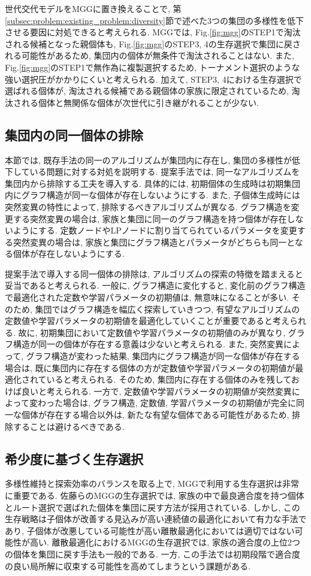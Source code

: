 \documentclass[11pt,oneside,openany,report]{jsbook}
\begin{document}
世代交代モデルをMGGに置き換えることで, 第\ref{subsec:problem:existing_problem:diversity}節で述べた3つの集団の多様性を低下させる要因に対処できると考えられる. MGGでは, Fig.\ref{fig:mgg}のSTEP1で淘汰される候補となった親個体も, Fig.\ref{fig:mgg}のSTEP3, 4の生存選択で集団に戻される可能性があるため, 集団内の個体が無条件で淘汰されることはない. また, Fig.\ref{fig:mgg}のSTEP1で無作為に複製選択するため, トーナメント選択のような強い選択圧がかかりにくいと考えられる. 加えて, STEP3, 4における生存選択で選ばれる個体が, 淘汰される候補である親個体の家族に限定されているため, 淘汰される個体と無関係な個体が次世代に引き継がれることが少ない.

\subsection{集団内の同一個体の排除}
本節では, 既存手法の同一のアルゴリズムが集団内に存在し, 集団の多様性が低下している問題に対する対処を説明する. 提案手法では, 同一なアルゴリズムを集団内から排除する工夫を導入する. 具体的には, 初期個体の生成時は初期集団内にグラフ構造が同一な個体が存在しないようにする. また, 子個体生成時には突然変異の特性によって, 排除するべきアルゴリズムが異なる. グラフ構造を変更する突然変異の場合は, 家族と集団に同一のグラフ構造を持つ個体が存在しないようにする. 定数ノードやLPノードに割り当てられているパラメータを変更する突然変異の場合は, 家族と集団にグラフ構造とパラメータがどちらも同一となる個体が存在しないようにする.

提案手法で導入する同一個体の排除は, アルゴリズムの探索の特徴を踏まえると妥当であると考えられる. 一般に, グラフ構造に変化すると, 変化前のグラフ構造で最適化された定数や学習パラメータの初期値は, 無意味になることが多い. そのため, 集団ではグラフ構造を幅広く探索していきつつ, 有望なアルゴリズムの定数値や学習パラメータの初期値を最適化していくことが重要であると考えられる. 故に, 初期集団において定数値や学習パラメータの初期値のみが異なり, グラフ構造が同一の個体が存在する意義は少ないと考えられる. また, 突然変異によって, グラフ構造が変わった結果, 集団内にグラフ構造が同一な個体が存在する場合は, 既に集団内に存在する個体の方が定数値や学習パラメータの初期値が最適化されていると考えられる. そのため, 集団内に存在する個体のみを残しておけば良いと考えられる. 一方で, 定数値や学習パラメータの初期値が突然変異によって変わった場合は, グラフ構造, 定数値, 学習パラメータの初期値が完全に同一な個体が存在する場合以外は, 新たな有望な個体である可能性があるため, 排除することは避けるべきである.

\subsection{希少度に基づく生存選択} \label{subsec:prposed:diversity:survival_selection}
多様性維持と探索効率のバランスを取る上で, MGGで利用する生存選択は非常に重要である. 佐藤らのMGGの生存選択では, 家族の中で最良適合度を持つ個体とルート選択で選ばれた個体を集団に戻す方法が採用されている\cite{mgg}. しかし, この生存戦略は子個体が改善する見込みが高い連続値の最適化において有力な手法であり, 子個体が改悪している可能性が高い離散最適化においては適切ではない可能性が高い. 離散最適化におけるMGGの生存選択では, 家族の適合度の上位2つの個体を集団に戻す手法も一般的である. 一方, この手法では初期段階で適合度の良い局所解に収束する可能性を高めてしまうという課題がある.
\end{document}
